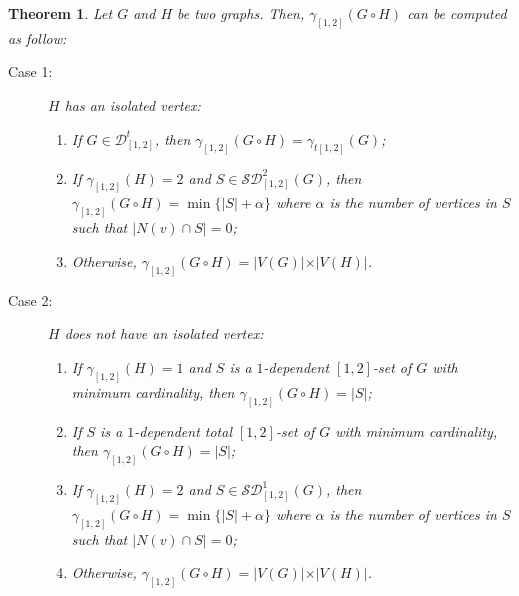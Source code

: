 \documentclass[A4,12pt]{article}
\newtheorem{theorem}{Theorem}[section]
\theoremstyle{definition}
\theoremstyle{remark}
\begin{document}
\begin{theorem} \label{lexthem2}
Let $G$ and $H$ be two graphs. Then, $\gamma_{[1,2]}(G\circ H)$ can be computed as follow:
\begin{description}
 \item[Case 1:]
  $H$ has  an isolated vertex:
 \begin{enumerate}
 \item [a)]
  If $G\in \mathcal{D}^t_{[1,2]}$,  then $\gamma_{[1,2]}(G \circ H)=\gamma_{t[1,2]}(G)$;
  \item [b)]
  If   $\gamma_{[1,2]}(H)=2$ and $S \in \mathcal{SD}^{2}_{[1,2]}(G)$, then $\gamma_{[1,2]}(G \circ H)=\min\{\vert S\vert +\alpha \}$ where $\alpha$ is the number of vertices in $S$ such that $\vert N(v)\cap S\vert =0$;
  \item [c)]
  Otherwise, $\gamma_{[1,2]}(G \circ H)=\vert V(G)\vert \times \vert V(H)\vert $.
  \end{enumerate}
  \item[Case 2:]
   $H$ does not have  an isolated vertex:
 \begin{enumerate}
 	\item [a)]
 	If $\gamma_{[1,2]}(H)=1$ and  $S$ is a $1$-dependent $[1,2]$-set of $G$ with minimum cardinality,  then $\gamma_{[1,2]}(G \circ H)=\vert S\vert $;
 	\item [b)]
 	If $S$ is a $1$-dependent total $[1,2]$-set of $G$  with minimum cardinality, then $\gamma_{[1,2]}(G \circ H)=\vert S\vert $;
  \item [c)]
  If $\gamma_{[1,2]}(H)=2$ and $S\in \mathcal{SD}^{1}_{[1,2]}(G)$, then $\gamma_{[1,2]}(G \circ H)=\min\{\vert S\vert +\alpha \}
  $ where $\alpha$ is the number of vertices in $S$ such that $\vert N(v)\cap S\vert =0$;
  \item [d)]
  Otherwise, $\gamma_{[1,2]}(G \circ H)=\vert V(G)\vert \times \vert V(H)\vert $.
\end{enumerate}
\end{description}
\end{theorem}
\end{document}
